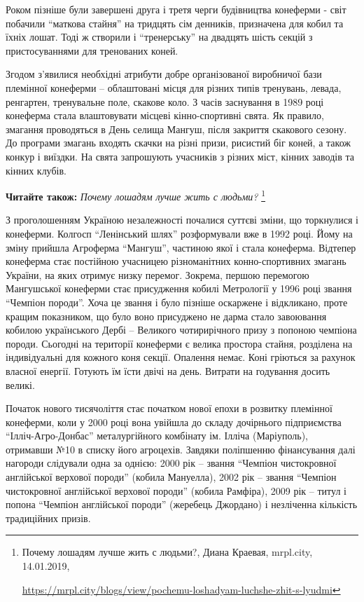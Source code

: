Роком пізніше були завершені друга і третя черги будівництва конеферми - світ
побачили \enquote{маткова стайня} на тридцять сім денників, призначена для кобил та
їхніх лошат. Тоді ж створили і \enquote{тренерську} на двадцять шість секцій з
пристосуваннями для тренованих коней.


Згодом з'явилися необхідні атрибути добре організованої виробничої бази
племінної конеферми – облаштовані місця для різних типів тренувань, левада,
ренгартен, тренувальне поле, скакове коло. З часів заснування в 1989 році
конеферма стала влаштовувати місцеві кінно-спортивні свята. Як правило,
змагання проводяться в День селища Мангуш, після закриття скакового сезону. До
програми змагань входять скачки на різні призи, рисистий біг коней, а також
конкур і виїздки. На свята запрошують учасників з різних міст, кінних заводів
та кінних клубів.

\textbf{Читайте також:} \emph{Почему лошадям лучше жить с людьми?}%
\footnote{Почему лошадям лучше жить с людьми?, Диана Краевая, mrpl.city, 14.01.2019, \par%
\url{https://mrpl.city/blogs/view/pochemu-loshadyam-luchshe-zhit-s-lyudmi}%
}

З проголошенням Україною незалежності почалися суттєві зміни, що торкнулися і
конеферми. Колгосп \enquote{Ленінський шлях} розформували вже в 1992 році. Йому
на зміну прийшла Агроферма \enquote{Мангуш}, частиною якої і стала конеферма.
Відтепер конеферма стає постійною учасницею різноманітних конно-спортивних
змагань України, на яких отримує низку перемог. Зокрема, першою перемогою
Мангушської конеферми стає присудження кобилі Метрології у 1996 році звання
\enquote{Чемпіон породи}. Хоча це звання і було пізніше оскаржене і відкликано,
проте кращим показником, що було воно присуджено не дарма стало завоювання
кобилою українського Дербі – Великого чотирирічного призу з попоною чемпіона
породи.  Сьогодні на території конеферми є велика простора стайня, розділена на
індивідуальні для кожного коня секції. Опалення немає. Коні гріються за рахунок
власної енергії. Готують їм їсти двічі на день. Витрати на годування досить
великі.


Початок нового тисячоліття стає початком нової епохи в розвитку племінної
конеферми, коли у 2000 році вона увійшла до складу дочірнього підприємства
\enquote{Ілліч-Агро-Донбас} металургійного комбінату ім. Ілліча (Маріуполь), отримавши
№10 в списку його агроцехів. Завдяки поліпшенню фінансування далі нагороди
слідували одна за однією: 2000 рік – звання \enquote{Чемпіон чистокровної англійської
верхової породи} (кобила Мануелла), 2002 рік – звання \enquote{Чемпіон чистокровної
англійської верхової породи} (кобила Рамфіра), 2009 рік – титул і попона
\enquote{Чемпіон англійської породи} (жеребець Джордано) і незліченна кількість
традиційних призів.

